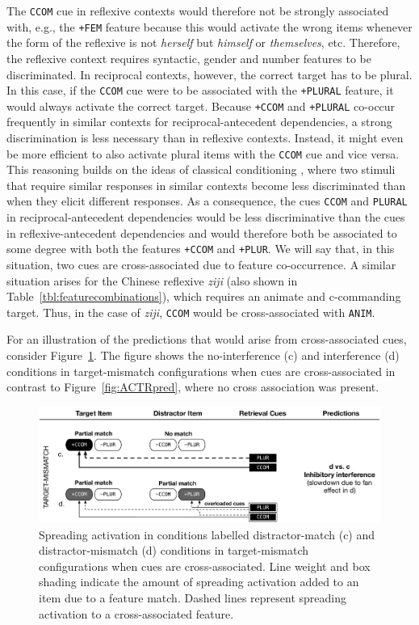 \documentclass{cambridge7A}\usepackage[]{graphicx}\usepackage[]{color}
\newcommand{\actrcue}[1]{\texttt{\uppercase{#1}}}
\newcommand{\match}[1]{\texttt{+\uppercase{#1}}}
\begin{document}
The \actrcue{CCOM} cue in reflexive contexts would therefore not be strongly associated with, e.g., the \match{FEM} feature because this would activate the wrong items whenever the form of the reflexive is not \textit{herself} but \textit{himself} or \textit{themselves}, etc. Therefore, the reflexive context requires syntactic, gender and number features to be discriminated.
In reciprocal contexts, however, the correct target has to be plural. In this case, if the \actrcue{CCOM} cue were to be associated with the \match{PLURAL} feature, it would always activate the correct target. 
Because \match{CCOM} and \match{PLURAL} co-occur frequently in similar contexts for reciprocal-antecedent dependencies, a strong discrimination is less necessary than in reflexive contexts. Instead, it might even be more efficient to also activate plural items with the \actrcue{ccom} cue and vice versa. 
This reasoning builds on the ideas of classical conditioning \citep{RescorlaWagner1972}, where two stimuli that require similar responses in similar contexts become less discriminated than when they elicit different responses.
As a consequence, the cues \actrcue{ccom} and \actrcue{plural} in reciprocal-antecedent dependencies would be less discriminative than the cues in reflexive-antecedent dependencies and would therefore both be associated to some degree with both the features \match{ccom} and \match{plur}. We will say that, in this situation, two cues are  cross-associated due to feature co-occurrence.
A similar situation arises for the Chinese reflexive \textit{ziji} (also shown in Table~\ref{tbl:featurecombinations}), which requires an animate and c-commanding target. Thus, in the case of \textit{ziji}, \actrcue{ccom} would be cross-associated with \actrcue{anim}.

For an illustration of the predictions that would arise from cross-associated cues, consider Figure~\ref{fig:newmodelcueconf}. The figure shows the no-interference (c) and interference (d) conditions in target-mismatch configurations when cues are cross-associated in contrast to Figure~\ref{fig:ACTRpred}, where no cross association was present.

\begin{figure}[!htbp]
\includegraphics[width=\textwidth]{figures/tableNewmodelcueconf}
	\caption{Spreading activation in conditions labelled distractor-match (c) and distractor-mismatch (d) conditions in target-mismatch configurations when cues are cross-associated. Line weight and box shading indicate the amount of spreading activation added to an item due to a feature match. Dashed lines represent spreading activation to a cross-associated feature.}
	\label{fig:newmodelcueconf}
\end{figure}
\end{document}
